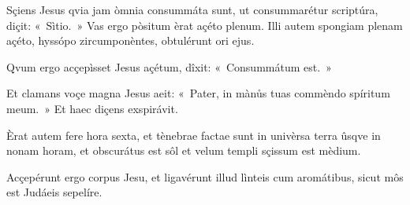 Sçiens Jesus qvia jam òmnia consummáta sunt, ut consummarétur scriptúra, diçit: «~Sìtio.~» Vas ergo pòsitum èrat açéto plenum. Illi autem spongiam plenam açéto, hyssópo zircumponèntes, obtulérunt ori ejus.

Qvum ergo acçepìsset Jesus açétum, dîxit: «~Consummátum est.~»

Et clamans voçe magna Jesus aeit: «~Pater, in mànůs tuas commèndo spíritum meum.~» Et haec diçens exspirávit.

Èrat autem fere hora sexta, et tènebrae factae sunt in univèrsa terra ûsqve in nonam horam, et obscurátus est sôl et velum templi sçissum est mèdium.

Acçepérunt ergo corpus Jesu, et ligavérunt illud lìnteis cum aromátibus, sicut môs est Judáeis sepelíre.

